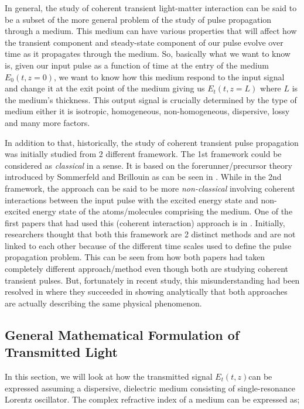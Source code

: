 In general, the study of coherent transient light-matter interaction can be said to be a subset of the more general problem of the study of pulse propagation through a medium. This medium can have various properties that will affect how the transient component and steady-state component of our pulse evolve over time as it propagates through the medium. So, basically what we want to know is, given our input pulse as a function of time at the entry of the medium $E_{0}(t, z = 0)$, we want to know how this medium respond to the input signal and change it at the exit point of the medium giving us $E_{t}(t, z = L)$ where $L$ is the medium's thickness. This output signal is crucially determined by the type of medium either it is isotropic, homogeneous, non-homogeneous, dispersive, lossy and many more factors.

In addition to that, historically, the study of coherent transient pulse propagation was initially studied from 2 different framework. The 1st framework could be considered as \textit{classical} in a sense. It is based on the forerunner/precursor theory introduced by Sommerfeld and Brillouin as can be seen in \cite{Sommerfeld1914, Brillouin1914}. While in the 2nd framework, the approach can be said to be more \textit{non-classical} involving coherent interactions between the input pulse with the excited energy state and non-excited energy state of the atoms/molecules comprising the medium. One of the first papers that had used this (coherent interaction) approach is in \cite{Crisp1970}. Initially, researchers thought that both this framework are 2 distinct methods and are not linked to each other because of the different time scales used to  define the pulse propagation problem. This can be seen from how both papers \cite{Segard_1987, Crisp1970} had taken completely different approach/method even though both are studying coherent transient pulses. But, fortunately in recent study, this misunderstanding had been resolved in \cite{Jeong2008} where they succeeded in showing analytically that both approaches are actually describing the same physical phenomenon.

\subsection{General Mathematical Formulation of Transmitted Light}\label{general}
In this section, we will look at how the transmitted signal $E_{t}(t, z)$can be expressed assuming a dispersive, dielectric medium consisting of single-resonance Lorentz oscillator. The complex refractive index of a medium can be expressed as;

